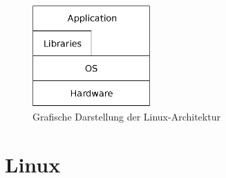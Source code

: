 \begin{itemize}
  \begin{figure}[H]
  \centering
  \includegraphics[width=0.4\textwidth]{Hauptteil/linuxmode.eps}
  \caption{Grafische Darstellung der Linux-Architektur}\label{fig:linuxmode}
  \end{figure}
\end{itemize}




\section{Linux}\label{kap:linux}


